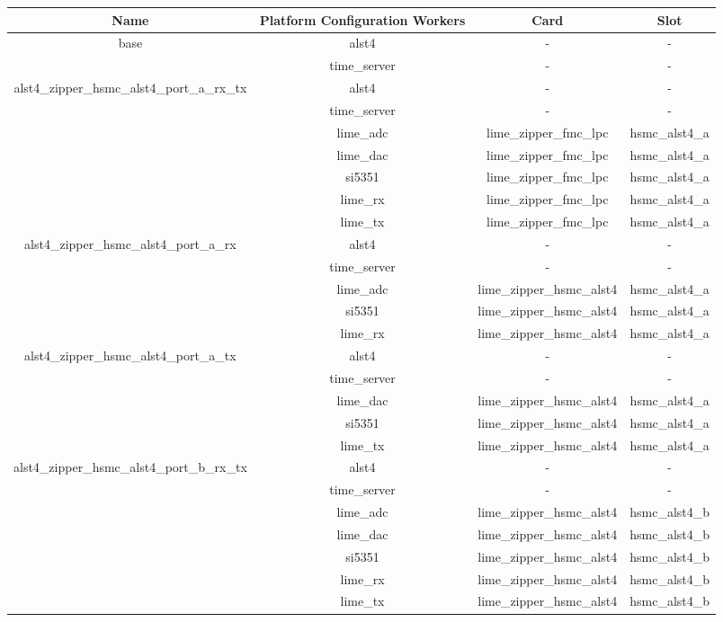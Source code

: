 \documentclass{article}
\def\comp{alst4}
\begin{document}
\begin{tabular}{|c|c|c|c|}
	\hline
	\rowcolor{blue}
	Name & Platform Configuration Workers & Card & Slot \\
	\hline
	\multirow{2}{*}{base} &\comp & - & - \\ &time\_server & - & - \\
	\hline
	\multirow{5}{*}{alst4\_zipper\_hsmc\_alst4\_port\_a\_rx\_tx}&
	\comp & - & - \\ &time\_server & - & -
	\\ &lime\_adc & lime\_zipper\_fmc\_lpc & hsmc\_alst4\_a \\
	&lime\_dac & lime\_zipper\_fmc\_lpc & hsmc\_alst4\_a \\
	&si5351 & lime\_zipper\_fmc\_lpc & hsmc\_alst4\_a \\
	&lime\_rx & lime\_zipper\_fmc\_lpc & hsmc\_alst4\_a \\
	&lime\_tx & lime\_zipper\_fmc\_lpc & hsmc\_alst4\_a \\
	\hline
	\multirow{5}{*}{alst4\_zipper\_hsmc\_alst4\_port\_a\_rx}&
	\comp & - & - \\ &time\_server & - & - \\ &lime\_adc &
	lime\_zipper\_hsmc\_alst4 & hsmc\_alst4\_a \\  &si5351 &
	lime\_zipper\_hsmc\_alst4 & hsmc\_alst4\_a \\ &lime\_rx &
	lime\_zipper\_hsmc\_alst4 & hsmc\_alst4\_a \\
	\hline
	\multirow{5}{*}{alst4\_zipper\_hsmc\_alst4\_port\_a\_tx}&
	\comp & - & - \\ &time\_server & - & - \\ &lime\_dac &
	lime\_zipper\_hsmc\_alst4 & hsmc\_alst4\_a \\  &si5351 &
	lime\_zipper\_hsmc\_alst4 & hsmc\_alst4\_a \\ &lime\_tx &
	lime\_zipper\_hsmc\_alst4 & hsmc\_alst4\_a \\
	\hline
	\multirow{5}{*}{alst4\_zipper\_hsmc\_alst4\_port\_b\_rx\_tx}&
	\comp & - & - \\ &time\_server & - & - \\ &lime\_adc &
	lime\_zipper\_hsmc\_alst4 & hsmc\_alst4\_b \\ &lime\_dac &
	lime\_zipper\_hsmc\_alst4 & hsmc\_alst4\_b \\ &si5351 &
	lime\_zipper\_hsmc\_alst4 & hsmc\_alst4\_b \\ &lime\_rx &
	lime\_zipper\_hsmc\_alst4 & hsmc\_alst4\_b \\ &lime\_tx &
	lime\_zipper\_hsmc\_alst4 & hsmc\_alst4\_b \\

\end{tabular}
\end{document}
